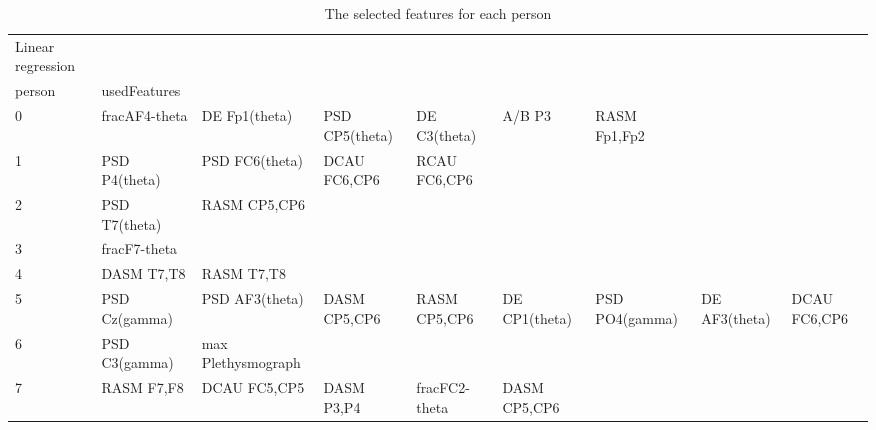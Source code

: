 \clearpage
\begin{landscape}
\begin{table}[]
\centering
\caption{The selected features for each person}
\begin{tabular}{l|llllllll}
Linear regression  &                      &                         &                      &                    &                       &                      &                 &                 \\
person             & usedFeatures         &                         &                      &                    &                       &                      &                 &                 \\
0                  & fracAF4-theta        & DE Fp1(theta)           & PSD CP5(theta)       & DE C3(theta)       & A/B P3                & RASM Fp1,Fp2         &                 &                 \\
1                  & PSD P4(theta)        & PSD FC6(theta)          & DCAU FC6,CP6         & RCAU FC6,CP6       &                       &                      &                 &                 \\
2                  & PSD T7(theta)        & RASM CP5,CP6            &                      &                    &                       &                      &                 &                 \\
3                  & fracF7-theta         &                         &                      &                    &                       &                      &                 &                 \\
4                  & DASM T7,T8           & RASM T7,T8              &                      &                    &                       &                      &                 &                 \\
5                  & PSD Cz(gamma)        & PSD AF3(theta)          & DASM CP5,CP6         & RASM CP5,CP6       & DE CP1(theta)         & PSD PO4(gamma)       & DE AF3(theta)   & DCAU FC6,CP6    \\
6                  & PSD C3(gamma)        & max Plethysmograph      &                      &                    &                       &                      &                 &                 \\
7                  & RASM F7,F8           & DCAU FC5,CP5            & DASM P3,P4           & fracFC2-theta      & DASM CP5,CP6          &                      &                 &                 \\

\end{tabular}
\end{table}
\end{landscape}
